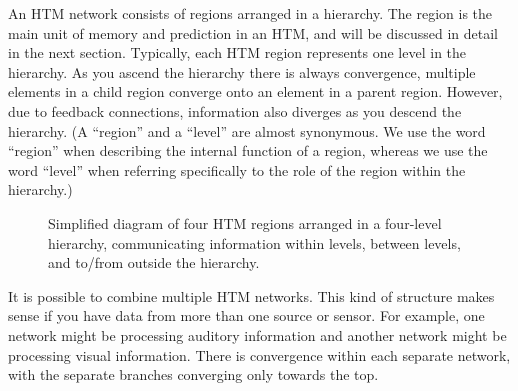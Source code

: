 \documentclass{report}
\begin{document}
An HTM network consists of regions arranged in a hierarchy. The region
is the main unit of memory and prediction in an HTM, and will be
discussed in detail in the next section. Typically, each HTM region
represents one level in the hierarchy. As you ascend the hierarchy
there is always convergence, multiple elements in a child region
converge onto an element in a parent region. However, due to feedback
connections, information also diverges as you descend the
hierarchy. (A ``region'' and a ``level'' are almost synonymous. We use
the word ``region'' when describing the internal function of a region,
whereas we use the word ``level'' when referring specifically to the
role of the region within the hierarchy.)

\begin{figure}
\caption{Simplified diagram of four HTM regions arranged in a
  four-level hierarchy, communicating information within levels,
  between levels, and to/from outside the hierarchy.}
\label{figure:region-hierarchy}
\end{figure}

It is possible to combine multiple HTM networks. This kind of
structure makes sense if you have data from more than one source or
sensor. For example, one network might be processing auditory
information and another network might be processing visual
information. There is convergence within each separate network, with
the separate branches converging only towards the top.
\end{document}
